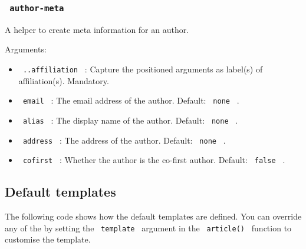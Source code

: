\subsubsection{\texorpdfstring{\texttt{\ author-meta\ }}{ author-meta }}\label{author-meta}

A helper to create meta information for an author.

Arguments:

\begin{itemize}
\tightlist
\item
  \texttt{\ ..affiliation\ } : Capture the positioned arguments as
  label(s) of affiliation(s). Mandatory.
\item
  \texttt{\ email\ } : The email address of the author. Default:
  \texttt{\ none\ } .
\item
  \texttt{\ alias\ } : The display name of the author. Default:
  \texttt{\ none\ } .
\item
  \texttt{\ address\ } : The address of the author. Default:
  \texttt{\ none\ } .
\item
  \texttt{\ cofirst\ } : Whether the author is the co-first author.
  Default: \texttt{\ false\ } .
\end{itemize}

\subsection{Default templates}\label{default-templates}

The following code shows how the default templates are defined. You can
override any of the by setting the \texttt{\ template\ } argument in the
\texttt{\ article()\ } function to customise the template.

